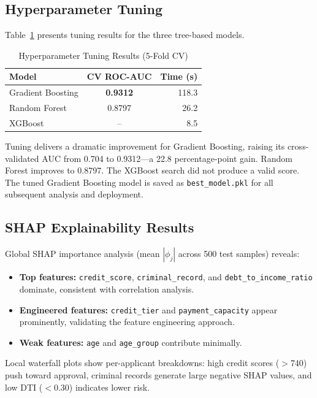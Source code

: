 \documentclass[journal]{IEEEtran}
\begin{document}
\subsection{Hyperparameter Tuning}

Table~\ref{tab:tuning_results} presents tuning results for the three tree-based models.

\begin{table}[!t]
\centering
\caption{Hyperparameter Tuning Results (5-Fold CV)}
\label{tab:tuning_results}
\begin{tabular}{lcr}
\toprule
\textbf{Model} & \textbf{CV ROC-AUC} & \textbf{Time (s)} \\
\midrule
Gradient Boosting & \textbf{0.9312} & 118.3 \\
Random Forest     & 0.8797             & 26.2  \\
XGBoost           & --                 & 8.5   \\
\bottomrule
\end{tabular}
\end{table}

Tuning delivers a dramatic improvement for Gradient Boosting, raising its cross-validated AUC from 0.704 to 0.9312---a 22.8 percentage-point gain. Random Forest improves to 0.8797. The XGBoost search did not produce a valid score. The tuned Gradient Boosting model is saved as \texttt{best\_model.pkl} for all subsequent analysis and deployment.


\subsection{SHAP Explainability Results}

Global SHAP importance analysis (mean $|\phi_j|$ across 500 test samples) reveals:

\begin{itemize}[nosep]
  \item \textbf{Top features:} \texttt{credit\_score}, \texttt{criminal\_record}, and \texttt{debt\_to\_income\_ratio} dominate, consistent with correlation analysis.
  \item \textbf{Engineered features:} \texttt{credit\_tier} and \texttt{payment\_capacity} appear prominently, validating the feature engineering approach.
  \item \textbf{Weak features:} \texttt{age} and \texttt{age\_group} contribute minimally.
\end{itemize}

Local waterfall plots show per-applicant breakdowns: high credit scores ($>$740) push toward approval, criminal records generate large negative SHAP values, and low DTI ($<$0.30) indicates lower risk.
\end{document}
